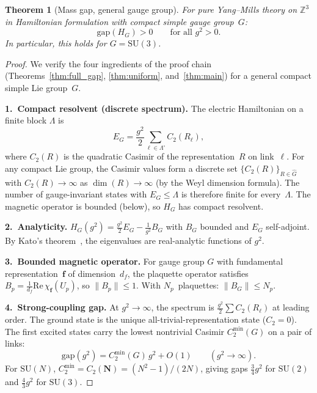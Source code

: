 \documentclass[12pt,a4paper]{article}
\newtheorem{theorem}{Theorem}[section]
\newcommand{\Z}{\mathbb{Z}}
\begin{document}
\begin{theorem}[Mass gap, general gauge group]\label{thm:general}
For pure Yang--Mills theory on $\Z^3$ in Hamiltonian formulation with compact simple gauge group~$G$:
\begin{equation}
\mathrm{gap}(H_G) > 0 \qquad \text{for all } g^2 > 0.
\end{equation}
In particular, this holds for $G=\mathrm{SU}(3)$.
\end{theorem}

\begin{proof}
We verify the four ingredients of the proof chain (Theorems~\ref{thm:full_gap}, \ref{thm:uniform}, and~\ref{thm:main}) for a general compact simple Lie group~$G$.

\textbf{1.~Compact resolvent (discrete spectrum).} The electric Hamiltonian on a finite block $\Lambda$ is
\begin{equation}
E_G = \frac{g^2}{2}\sum_{\ell\in\Lambda^\circ} C_2(R_\ell),
\end{equation}
where $C_2(R)$ is the quadratic Casimir of the representation~$R$ on link~$\ell$. For any compact Lie group, the Casimir values form a discrete set $\{C_2(R)\}_{R\in\hat{G}}$ with $C_2(R)\to\infty$ as $\dim(R)\to\infty$ (by the Weyl dimension formula). The number of gauge-invariant states with $E_G\le\Lambda$ is therefore finite for every~$\Lambda$. The magnetic operator is bounded (below), so $H_G$ has compact resolvent.

\textbf{2.~Analyticity.} $H_G(g^2)=\frac{g^2}{2}E_G - \frac{1}{g^2}B_G$ with $B_G$ bounded and $E_G$ self-adjoint. By Kato's theorem~\cite{Kato}, the eigenvalues are real-analytic functions of $g^2$.

\textbf{3.~Bounded magnetic operator.} For gauge group $G$ with fundamental representation~$\mathbf{f}$ of dimension~$d_f$, the plaquette operator satisfies $B_p = \frac{1}{d_f}\mathrm{Re}\,\chi_{\mathbf{f}}(U_p)$, so $\|B_p\|\le 1$. With $N_p$~plaquettes: $\|B_G\|\le N_p$.

\textbf{4.~Strong-coupling gap.} At $g^2\to\infty$, the spectrum is $\frac{g^2}{2}\sum C_2(R_\ell)$ at leading order. The ground state is the unique all-trivial-representation state ($C_2=0$). The first excited states carry the lowest nontrivial Casimir $C_2^{\min}(G)$ on a pair of links:
\begin{equation}
\mathrm{gap}(g^2) = C_2^{\min}(G)\,g^2 + O(1) \qquad (g^2\to\infty).
\end{equation}
For $\mathrm{SU}(N)$, $C_2^{\min}=C_2(\mathbf{N})=(N^2-1)/(2N)$, giving gaps $\frac{3}{4}g^2$ for $\mathrm{SU}(2)$ and $\frac{4}{3}g^2$ for $\mathrm{SU}(3)$.


\end{proof}
\end{document}
